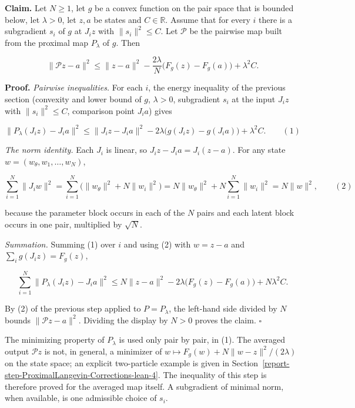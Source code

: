 \documentclass[11pt,a4paper]{report}
\begin{document}
\textbf{Claim.} Let \(N\ge1\), let \(g\) be a convex function on the pair space that is bounded below, let \(\lambda>0\), let \(z,a\) be states and \(C\in\mathbb R\). Assume that for every \(i\) there is a subgradient \(s_i\) of \(g\) at \(J_iz\) with \(\|s_i\|^2\le C\). Let \(\mathcal P\) be the pairwise map built from the proximal map \(P_\lambda\) of \(g\). Then


\[\|\mathcal Pz-a\|^2\le\|z-a\|^2-\frac{2\lambda}{N}\bigl(F_g(z)-F_g(a)\bigr)+\lambda^2C .\]


\textbf{Proof.} \emph{Pairwise inequalities.} For each \(i\), the energy inequality of the previous section (convexity and lower bound of \(g\), \(\lambda>0\), subgradient \(s_i\) at the input \(J_iz\) with \(\|s_i\|^2\le C\), comparison point \(J_ia\)) gives


\[\|P_\lambda(J_iz)-J_ia\|^2\le\|J_iz-J_ia\|^2-2\lambda\bigl(g(J_iz)-g(J_ia)\bigr)+\lambda^2C.\qquad(1)\]


\emph{The norm identity.} Each \(J_i\) is linear, so \(J_iz-J_ia=J_i(z-a)\). For any state \(w=(w_\theta,w_1,\dots,w_N)\),


\[\sum_{i=1}^N\|J_iw\|^2=\sum_{i=1}^N\bigl(\|w_\theta\|^2+N\|w_i\|^2\bigr)=N\|w_\theta\|^2+N\sum_{i=1}^N\|w_i\|^2=N\|w\|^2,\qquad(2)\]


because the parameter block occurs in each of the \(N\) pairs and each latent block occurs in one pair, multiplied by \(\sqrt N\).




\emph{Summation.} Summing (1) over \(i\) and using (2) with \(w=z-a\) and \(\sum_ig(J_iz)=F_g(z)\),


\[\sum_{i=1}^N\|P_\lambda(J_iz)-J_ia\|^2\le N\|z-a\|^2-2\lambda\bigl(F_g(z)-F_g(a)\bigr)+N\lambda^2C .\]


By (2) of the previous step applied to \(P=P_\lambda\), the left-hand side divided by \(N\) bounds \(\|\mathcal Pz-a\|^2\). Dividing the display by \(N>0\) proves the claim. \(\square\)




The minimizing property of \(P_\lambda\) is used only pair by pair, in (1). The averaged output \(\mathcal Pz\) is not, in general, a minimizer of \(w\mapsto F_g(w)+N\|w-z\|^2/(2\lambda)\) on the state space; an explicit two-particle example is given in Section~\ref{report-step-ProximalLangevin-Corrections-lean-4}. The inequality of this step is therefore proved for the averaged map itself. A subgradient of minimal norm, when available, is one admissible choice of \(s_i\).
\end{document}
